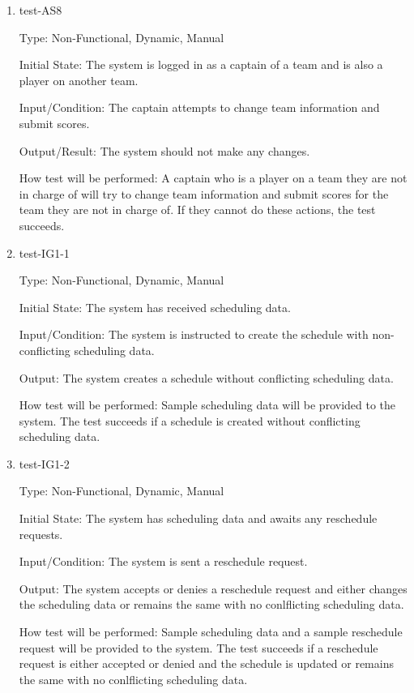 \documentclass[12pt, titlepage]{article}
\begin{document}
\begin{enumerate}
  \item{test-AS8\\}

  Type: Non-Functional, Dynamic, Manual

  Initial State: The system is logged in as a captain of a team and is also a
  player on another team.

  Input/Condition: The captain attempts to change team information and submit
  scores.

  Output/Result: The system should not make any changes.

  How test will be performed: A captain who is a player on a team they are not
  in charge of will try to change team information and submit scores for the
  team they are not in charge of. If they cannot do these actions, the test
  succeeds.

  \item{test-IG1-1\\}

  Type: Non-Functional, Dynamic, Manual

  Initial State: The system has received scheduling data.

  Input/Condition: The system is instructed to create the schedule with non-conflicting
  scheduling data.

  Output: The system creates a schedule without conflicting scheduling data.

  How test will be performed: Sample scheduling data will be provided to the system. The test
  succeeds if a schedule is created without conflicting scheduling data.

  \item{test-IG1-2\\}

  Type: Non-Functional, Dynamic, Manual

  Initial State: The system has scheduling data and awaits any reschedule requests.

  Input/Condition: The system is sent a reschedule request.

  Output: The system accepts or denies a reschedule request and either changes the scheduling
  data or remains the same with no conlflicting scheduling data.

  How test will be performed: Sample scheduling data and a sample reschedule request
  will be provided to the system. The test succeeds if a reschedule request is either accepted
  or denied and the schedule is updated or remains the same with no conlflicting scheduling
  data.


\end{enumerate}
\end{document}
